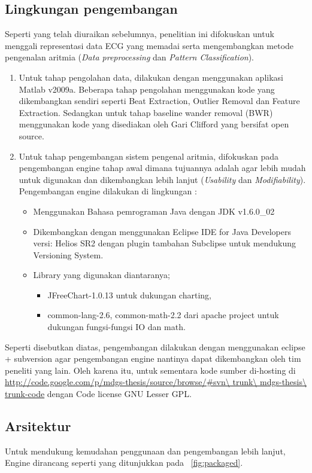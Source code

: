 \subsection{Lingkungan pengembangan}
Seperti yang telah diuraikan sebelumnya, penelitian ini difokuskan untuk
menggali representasi data ECG yang memadai serta mengembangkan metode
pengenalan aritmia (\emph{Data preprocessing} dan \emph{Pattern
Classification}). 
\begin{enumerate}
  \item Untuk tahap pengolahan data, dilakukan dengan menggunakan aplikasi
  Matlab v2009a. Beberapa tahap pengolahan menggunakan kode yang
  dikembangkan sendiri seperti Beat Extraction, Outlier Removal dan
  Feature Extraction. Sedangkan untuk tahap baseline wander removal (BWR)
  menggunakan kode yang disediakan oleh Gari Clifford \cite{Clifford:2005} yang
  bersifat open source.
  \item Untuk tahap pengembangan sistem pengenal aritmia, difokuskan pada
  pengembangan engine tahap awal dimana tujuannya adalah agar lebih mudah untuk
  digunakan dan dikembangkan lebih lanjut (\emph{Usability} dan
  \emph{Modifiability}). Pengembangan engine dilakukan di lingkungan :
  \begin{itemize}
    \item Menggunakan Bahasa pemrograman Java dengan JDK v1.6.0\_02
    \item Dikembangkan dengan menggunakan Eclipse IDE for Java Developers
    versi: Helios SR2 dengan plugin tambahan Subclipse untuk mendukung
    Versioning System.
    \item Library yang digunakan diantaranya;
    \begin{itemize}
      \item JFreeChart-1.0.13 untuk dukungan charting, 
      \item common-lang-2.6, common-math-2.2 dari apache project untuk dukungan
      fungsi-fungsi IO dan math.
	\end{itemize}
  \end{itemize}
\end{enumerate}
Seperti disebutkan diatas, pengembangan dilakukan dengan menggunakan eclipse +
subversion agar pengembangan engine nantinya dapat dikembangkan oleh tim
peneliti yang lain. Oleh karena itu, untuk sementara kode sumber di-hosting di
\url{http://code.google.com/p/mdgs-thesis/source/browse/#svn\ trunk\
mdgs-thesis\ trunk-code} dengan Code license GNU Lesser GPL.

\subsection{Arsitektur}
Untuk mendukung kemudahan penggunaan dan pengembangan lebih lanjut, Engine
dirancang seperti yang ditunjukkan pada \pic~\ref{fig:packaged}.


